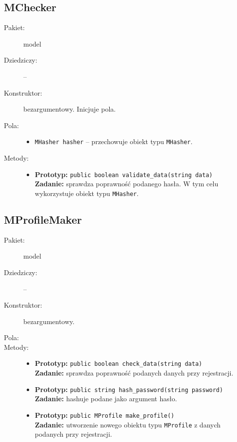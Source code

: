 \documentclass[a4paper]{article}
\newcommand{\prog}{\texttt}
\begin{document}
\subsection{MChecker}
\begin{description}
    \item[Pakiet:] model
    \item[Dziedziczy:] --
    \item[Konstruktor:] bezargumentowy. Inicjuje pola.
    \item[Pola:] \hfill
    \begin{itemize}
        \item \prog{MHasher hasher} -- przechowuje obiekt typu \prog{MHasher}.
    \end{itemize}
    \item[Metody:] \hfill
    \begin{itemize}
        \item \textbf{Prototyp:} \prog{public boolean validate\_data(string data)}\\\textbf{Zadanie:} sprawdza poprawność podanego hasła. W tym celu wykorzystuje obiekt typu \prog{MHasher}.
    \end{itemize}
\end{description}

\subsection{MProfileMaker}
\begin{description}
    \item[Pakiet:] model
    \item[Dziedziczy:] --
    \item[Konstruktor:] bezargumentowy.
    \item[Pola:] \hfill
    \begin{itemize}

    \end{itemize}
    \item[Metody:] \hfill
    \begin{itemize}
        \item \textbf{Prototyp:} \prog{public boolean check\_data(string data)}\\\textbf{Zadanie:} sprawdza poprawność podanych danych przy rejestracji.
        \item \textbf{Prototyp:} \prog{public string hash\_password(string password)}\\\textbf{Zadanie:} hashuje podane jako argument hasło.
        \item \textbf{Prototyp:} \prog{public MProfile make\_profile()}\\\textbf{Zadanie:} utworzenie nowego obiektu typu \prog{MProfile} z danych podanych przy rejestracji.
    \end{itemize}
\end{description}
\end{document}

